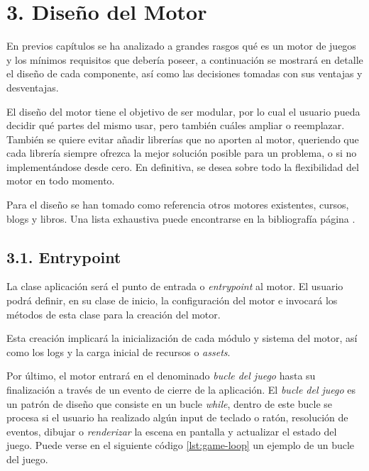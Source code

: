\chapter*{3. Diseño del Motor}\label{cap:design}

En previos capítulos se ha analizado a grandes rasgos qué es un motor de 
juegos y los mínimos requisitos que debería poseer, a continuación se mostrará en detalle el
diseño de cada componente, así como las decisiones tomadas con sus ventajas y desventajas.

El diseño del motor tiene el objetivo de ser modular, por lo cual el usuario pueda decidir qué partes del mismo usar, 
pero también cuáles ampliar o reemplazar. También se quiere evitar añadir librerías que no aporten al motor, 
queriendo que cada librería siempre ofrezca la mejor solución posible para un problema, o si no implementándose desde cero.
En definitiva, se desea sobre todo la flexibilidad del motor en todo momento.

Para el diseño se han tomado como referencia otros motores existentes, cursos, blogs y libros\cite{hazel}\cite{master-course}\cite{engine-book}\cite{game-patterns}. Una lista
exhaustiva puede encontrarse en la bibliografía página \pageref{cap:bibliography}.

\section*{3.1. Entrypoint}\label{sec:entrypoint}
La clase aplicación será el punto de entrada o \textit{entrypoint} al motor. El usuario podrá definir, en su clase de inicio, 
la configuración del motor e invocará los métodos de esta clase para la creación del motor. 

Esta creación implicará la inicialización de cada módulo y sistema del motor, así como los logs y la carga inicial
de recursos o \textit{assets}. 

Por último, el motor entrará en el denominado \textit{bucle del juego} hasta su finalización a través de un evento
de cierre de la aplicación. El \textit{bucle del juego} es un patrón de diseño\cite{game-loop-pattern} que consiste
en un bucle \textit{while}, dentro de este bucle se procesa si el usuario ha realizado algún input de teclado o ratón,
resolución de eventos, dibujar o \textit{renderizar} la escena en pantalla y actualizar el estado del juego.
Puede verse en el siguiente código \ref{lst:game-loop} un ejemplo de un bucle del juego.

